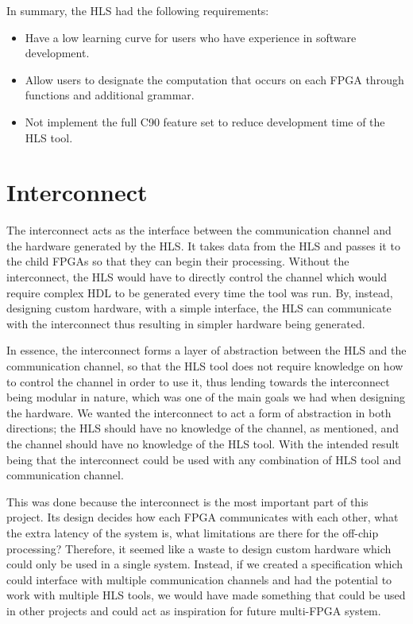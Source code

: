 In summary, the HLS had the following requirements:

\begin{itemize}
    \item Have a low learning curve for users who have experience in software development.
    \item Allow users to designate the computation that occurs on each FPGA through functions and additional grammar.
    \item Not implement the full C90 feature set to reduce development time of the HLS tool.
\end{itemize}

\section{Interconnect}
\label{sec:interconnect_design}

The interconnect acts as the interface between the communication channel and the hardware generated by the HLS. It takes data from the HLS and passes it to the child FPGAs so that they can begin their processing. Without the interconnect, the HLS would have to directly control the channel which would require complex HDL to be generated every time the tool was run. By, instead, designing custom hardware, with a simple interface, the HLS can communicate with the interconnect thus resulting in simpler hardware being generated.

In essence, the interconnect forms a layer of abstraction between the HLS and the communication channel, so that the HLS tool does not require knowledge on how to control the channel in order to use it, thus lending towards the interconnect being modular in nature, which was one of the main goals we had when designing the hardware. We wanted the interconnect to act a form of abstraction in both directions; the HLS should have no knowledge of the channel, as mentioned, and the channel should have no knowledge of the HLS tool. With the intended result being that the interconnect could be used with any combination of HLS tool and communication channel.

This was done because the interconnect is the most important part of this project. Its design decides how each FPGA communicates with each other, what the extra latency of the system is, what limitations are there for the off-chip processing? Therefore, it seemed like a waste to design custom hardware which could only be used in a single system. Instead, if we created a specification which could interface with multiple communication channels and had the potential to work with multiple HLS tools, we would have made something that could be used in other projects and could act as inspiration for future multi-FPGA system.

